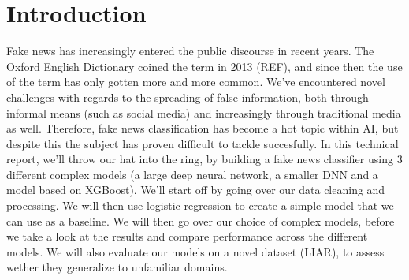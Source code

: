 \section{Introduction}
Fake news has increasingly entered the public discourse in recent years. The Oxford English Dictionary coined the term
in 2013 (REF), and since then the use of the term has only gotten more and more common. We've encountered
novel challenges with regards to the spreading of false information, both through informal means (such as social media)
and increasingly through traditional media as well. Therefore, fake news classification has become a hot topic within AI,
but despite this the subject has proven difficult to tackle succesfully. In this technical report, we'll throw our hat
into the ring, by building a fake news classifier using 3 different complex models (a large deep neural network, a
smaller DNN and a model based on XGBoost). We'll start off by going over our
data cleaning and processing. We will then use logistic regression to create a simple model that we can use as a
baseline. We will then go over our choice of complex models, before we take a look at the results and compare
performance across the different models. We will also evaluate our models on a novel dataset (LIAR), to assess wether
they generalize to unfamiliar domains.

